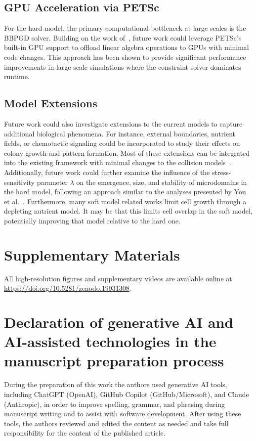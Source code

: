 \documentclass[a4paper,fleqn]{cas-dc}
\begin{document}
\subsection{GPU Acceleration via PETSc}

For the hard model, the primary computational bottleneck at large scales is the BBPGD solver. Building on the work of~\cite{Tasora2008}, future work could leverage PETSc's built-in GPU support to offload linear algebra operations to GPUs with minimal code changes. This approach has been shown to provide significant performance improvements in large-scale simulations where the constraint solver dominates runtime.

\subsection{Model Extensions}

Future work could also investigate extensions to the current models to capture additional biological phenomena. For instance, external boundaries, nutrient fields, or chemotactic signaling could be incorporated to study their effects on colony growth and pattern formation. Most of these extensions can be integrated into the existing framework with minimal changes to the collision models~\cite{Yan_2020}. Additionally, future work could further examine the influence of the stress-sensitivity parameter $\lambda$ on the emergence, size, and stability of microdomains in the hard model, following an approach similar to the analyses presented by You et al.~\cite{You2018}. Furthermore, many soft model related works limit cell growth through a depleting nutrient model. It may be that this limits cell overlap in the soft model, potentially improving that model relative to the hard one.

\section{Supplementary Materials}

All high-resolution figures and supplementary videos are available online at \url{https://doi.org/10.5281/zenodo.19931308}.

\section{Declaration of generative AI and AI-assisted technologies in the manuscript preparation process}

During the preparation of this work the authors used generative AI tools, including ChatGPT (OpenAI), GitHub Copilot (GitHub/Microsoft), and Claude (Anthropic), in order to improve spelling, grammar, and phrasing during manuscript writing and to assist with software development. After using these tools, the authors reviewed and edited the content as needed and take full responsibility for the content of the published article.
\end{document}
